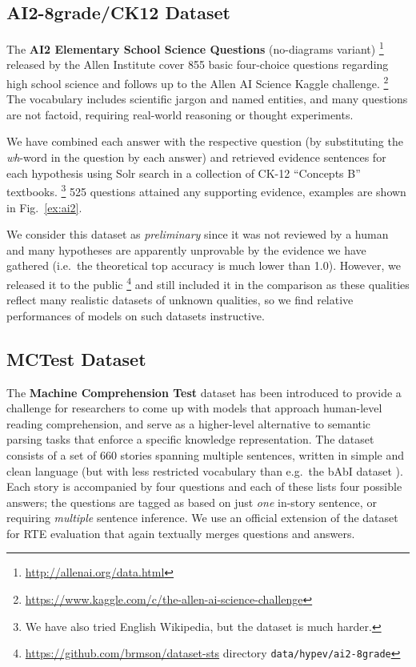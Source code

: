 \documentclass[11pt]{article}
\begin{document}
\subsection{AI2-8grade/CK12 Dataset}

The \textbf{AI2 Elementary School Science Questions} (no-diagrams variant)%
\footnote{\url{http://allenai.org/data.html}} released by the Allen Institute
cover 855 basic four-choice questions regarding high school science
and follows up to the Allen AI Science Kaggle challenge.%
\footnote{\url{https://www.kaggle.com/c/the-allen-ai-science-challenge}}
The vocabulary includes scientific jargon and named entities, and many questions
are not factoid, requiring real-world reasoning or thought experiments.

We have combined each answer with the respective question (by
substituting the \textit{wh}-word in the question by each answer) and retrieved
evidence sentences for each hypothesis using Solr search in a collection
of CK-12 ``Concepts B'' textbooks.%
\footnote{We have also tried English Wikipedia, but the dataset is much harder.}
525 questions attained any supporting evidence,
examples are shown in Fig.~\ref{ex:ai2}.

We consider this dataset as \textit{preliminary} since it was not reviewed
by a human and many hypotheses are apparently unprovable by the evidence
we have gathered (i.e.\ the theoretical top accuracy is much lower
than 1.0).  However, we released it to the public%
\footnote{\url{https://github.com/brmson/dataset-sts} directory \texttt{data/hypev/ai2-8grade}}
and still included it in the comparison as these
qualities reflect many realistic datasets of unknown qualities, so
we find relative performances of models on such datasets instructive.


\subsection{MCTest Dataset}

The \textbf{Machine Comprehension Test} \cite{MCTest} dataset has been introduced
to provide a challenge for researchers to come up with models that approach
human-level reading comprehension, and serve as a higher-level alternative
to semantic parsing tasks that enforce a specific knowledge representation.
The dataset consists of a set of 660 stories spanning
multiple sentences, written in simple and clean language (but with less restricted
vocabulary than e.g.\ the bAbI dataset \cite{bAbI}).  Each story is accompanied
by four questions and each of these lists four possible answers; the questions are tagged
as based on just \textit{one} in-story sentence, or requiring \textit{multiple} sentence inference.
We use an official extension of the dataset for RTE evaluation
that again textually merges questions and answers.
\end{document}
